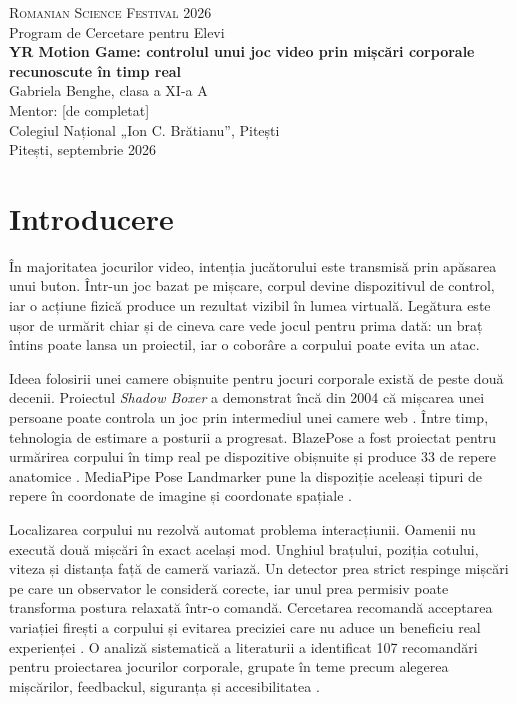 \documentclass[12pt, a4paper]{article}
\newcommand{\titlulProiectului}{YR Motion Game: controlul unui joc video prin mișcări corporale recunoscute în timp real}
\newcommand{\numeElevi}{Gabriela Benghe, clasa a XI-a A}
\newcommand{\numeMentor}{[de completat]}
\newcommand{\institutie}{Colegiul Național „Ion C. Brătianu”, Pitești}
\begin{document}
\begin{titlepage}
\centering
\vspace*{2cm}
{\Large\textsc{Romanian Science Festival 2026}}\\[0.3cm]
{\small Program de Cercetare pentru Elevi}\\[2.5cm]
{\LARGE\bfseries \titlulProiectului}\\[2cm]
{\large \numeElevi}\\[0.5cm]
{\normalsize Mentor: \numeMentor}\\[0.3cm]
{\normalsize \institutie}\\[3cm]
\vfill
{\normalsize Pitești, septembrie 2026}
\end{titlepage}

\tableofcontents
\newpage

\section{Introducere}

În majoritatea jocurilor video, intenția jucătorului este transmisă prin apăsarea
unui buton. Într-un joc bazat pe mișcare, corpul devine dispozitivul de control, iar
o acțiune fizică produce un rezultat vizibil în lumea virtuală. Legătura este ușor de
urmărit chiar și de cineva care vede jocul pentru prima dată: un braț întins poate
lansa un proiectil, iar o coborâre a corpului poate evita un atac.

Ideea folosirii unei camere obișnuite pentru jocuri corporale există de peste două
decenii. Proiectul \textit{Shadow Boxer} a demonstrat încă din 2004 că mișcarea unei
persoane poate controla un joc prin intermediul unei camere web
\parencite{hoysniemi2004}. Între timp, tehnologia de estimare a posturii a progresat.
BlazePose a fost proiectat pentru urmărirea corpului în timp real pe dispozitive
obișnuite și produce 33 de repere anatomice \parencite{bazarevsky2020}. MediaPipe
Pose Landmarker pune la dispoziție aceleași tipuri de repere în coordonate de imagine
și coordonate spațiale \parencite{googlepose2026}.

Localizarea corpului nu rezolvă automat problema interacțiunii. Oamenii nu execută
două mișcări în exact același mod. Unghiul brațului, poziția cotului, viteza și
distanța față de cameră variază. Un detector prea strict respinge mișcări pe care un
observator le consideră corecte, iar unul prea permisiv poate transforma postura
relaxată într-o comandă. Cercetarea recomandă acceptarea variației firești a corpului
și evitarea preciziei care nu aduce un beneficiu real experienței
\parencite{isbister2015}. O analiză sistematică a literaturii a identificat 107
recomandări pentru proiectarea jocurilor corporale, grupate în teme precum alegerea
mișcărilor, feedbackul, siguranța și accesibilitatea \parencite{subramanian2020}.
\end{document}
